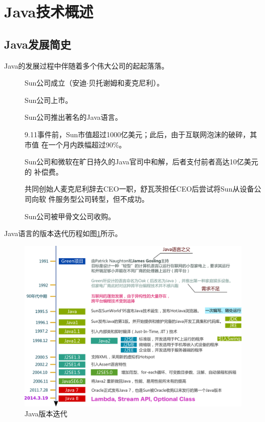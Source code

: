 \section{Java技术概述}

\subsection{Java发展简史}

Java的发展过程中伴随着多个伟大公司的起起落落。

\begin{description}
\item[] Sun公司成立（安迪$\cdot$贝托谢姆和麦克尼利）。
\item[] Sun公司上市。
\item[] Sun公司推出著名的Java语言。
\item[] 9.11事件前，Sun市值超过1000亿美元；此后，由于互联网泡沫的破碎，其市值
  在一个月内跌幅超过90\%。
\item[] Sun公司和微软在旷日持久的Java官司中和解，后者支付前者高达10亿美元的
  补偿费。
\item[] 共同创始人麦克尼利辞去CEO一职，舒瓦茨担任CEO后尝试将Sun从设备公司向软
  件服务型公司转型，但不成功。
\item[] Sun公司被甲骨文公司收购。
\end{description}

Java语言的版本迭代历程如图\ref{fig:java-versions}所示。

\begin{figure}[htb]
\centering
\includegraphics[width=\textwidth]{images/Introduction-to-Java/fig-java-versions.pdf}
\caption{Java版本迭代}
\label{fig:java-versions}
\end{figure}

